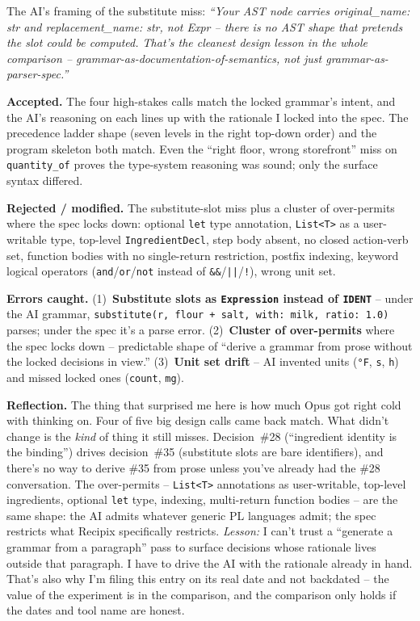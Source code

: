 \documentclass[11pt,a4paper]{article}
\newcommand{\field}[1]{\noindent\textbf{#1}}
\begin{document}
The AI's framing of the substitute miss: \emph{``Your AST node carries
original\_name: str and replacement\_name: str, not Expr -- there is no
AST shape that pretends the slot could be computed. That's the cleanest
design lesson in the whole comparison -- grammar-as-documentation-of-semantics,
not just grammar-as-parser-spec.''}

\field{Accepted.} The four high-stakes calls match the locked grammar's
intent, and the AI's reasoning on each lines up with the rationale I
locked into the spec. The precedence ladder shape (seven levels in the
right top-down order) and the program skeleton both match. Even the
``right floor, wrong storefront'' miss on \texttt{quantity\_of} proves
the type-system reasoning was sound; only the surface syntax differed.

\field{Rejected / modified.} The substitute-slot miss plus a cluster of
over-permits where the spec locks down: optional \texttt{let} type
annotation, \texttt{List<T>} as a user-writable type, top-level
\texttt{IngredientDecl}, step body absent, no closed action-verb set,
function bodies with no single-return restriction, postfix indexing,
keyword logical operators (\texttt{and}/\texttt{or}/\texttt{not}
instead of \texttt{\&\&}/\texttt{||}/\texttt{!}), wrong unit set.

\field{Errors caught.} (1)~\textbf{Substitute slots as \texttt{Expression}
instead of \texttt{IDENT}} -- under the AI grammar,
\texttt{substitute(r, flour + salt, with: milk, ratio: 1.0)} parses;
under the spec it's a parse error. (2)~\textbf{Cluster of over-permits}
where the spec locks down -- predictable shape of ``derive a grammar
from prose without the locked decisions in view.'' (3)~\textbf{Unit set
drift} -- AI invented units (\texttt{°F}, \texttt{s}, \texttt{h}) and
missed locked ones (\texttt{count}, \texttt{mg}).

\field{Reflection.} The thing that surprised me here is how much Opus
got right cold with thinking on. Four of five big design calls came
back match. What didn't change is the \emph{kind} of thing it still
misses. Decision~\#28 (``ingredient identity is the binding'') drives
decision~\#35 (substitute slots are bare identifiers), and there's no
way to derive \#35 from prose unless you've already had the \#28
conversation. The over-permits -- \texttt{List<T>} annotations as
user-writable, top-level ingredients, optional \texttt{let} type,
indexing, multi-return function bodies -- are the same shape: the AI
admits whatever generic PL languages admit; the spec restricts what
Recipix specifically restricts. \emph{Lesson:} I can't trust a
``generate a grammar from a paragraph'' pass to surface decisions
whose rationale lives outside that paragraph. I have to drive the AI
with the rationale already in hand. That's also why I'm filing this
entry on its real date and not backdated -- the value of the
experiment is in the comparison, and the comparison only holds if
the dates and tool name are honest.
\end{document}
